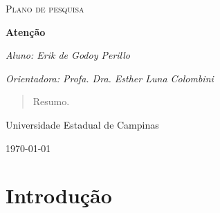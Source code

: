 \documentclass[11pt]{article}
\begin{document}
\begin{titlepage}
	\centering
	{\scshape\Large Plano de pesquisa\par}
	\vspace{1.5cm}
	{\huge \bfseries Atenção\par}
	\vspace{1cm}
	{\itshape Aluno: Erik de Godoy Perillo\par}
	{\itshape Orientadora: Profa. Dra. Esther Luna Colombini\par}
	\vspace{0.5cm}
	\begin{abstract}
        Resumo.
	\end{abstract}
	\vfill
	Universidade Estadual de Campinas
	\vfill
	{\large \today\par}
\end{titlepage}

\newpage

\section{Introdução}

\printbibliography
\end{document}
